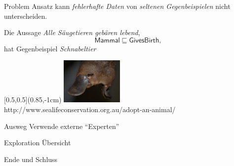 \documentclass[ngerman]{beamer}
\begin{document}
\begin{frame}

  \onslide<+->

  \begin{block}{Problem}
    Ansatz kann \emph{fehlerhafte Daten} von \emph{seltenen Gegenbeispielen} nicht
    unterscheiden.
  \end{block}

  \onslide<+->

  \begin{Beispiel}
    Die Aussage \emph{Alle Säugetieren gebären lebend},
    \begin{equation*}
      \mathsf{Mammal} \sqsubseteq \mathsf{GivesBirth},
    \end{equation*}
    \onslide<+->
    hat Gegenbeispiel \emph{Schnabeltier}
  
    \begin{textblock*}{\linewidth}[0.5,0.5](0.85\linewidth,-1cm)
      \centering
      \includegraphics[width=3cm]{platypus}\\[-2ex]
      {\fontsize{3pt}{4pt}\selectfont http://www.sealifeconservation.org.au/adopt-an-animal/}
    \end{textblock*}

  \end{Beispiel}

  \onslide<+->

  \begin{block}{Ausweg}
    Verwende externe \enquote{Experten}
  \end{block}

\end{frame}

\begin{frame}
  Exploration Übersicht
\end{frame}

\begin{frame}
  Ende und Schluss
\end{frame}
\end{document}
